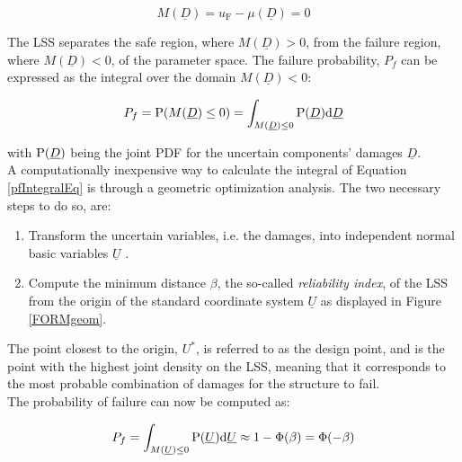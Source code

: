 \begin{equation}
    M(\underline{D}) = u_{\text{F}} - \mu (\underline{D}) = 0
\end{equation}


The \gls{LSS} separates the safe region, where $M(\underline{D}) > 0$, from the failure region, where $M(\underline{D}) < 0$, of the parameter space. The failure probability, $P_f$ can be expressed as the integral over the domain $M(\underline{D}) < 0$:

\begin{equation}
    P_f = \text{P}(M(\underline{D}) \leq 0) = \int _{M(\underline{D})\leq 0} \text{P}(\underline{D}) \mathrm{d}\underline{D} \label{pfIntegralEq}
\end{equation}

with $\text{P}(\underline{D})$ being the joint \gls{PDF} for the uncertain components' damages $\underline{D}$.\\

A computationally inexpensive way to calculate the integral of Equation \ref{pfIntegralEq} is through a geometric optimization analysis. The two necessary steps to do so, are:

\begin{enumerate}
    \item Transform the uncertain variables, i.e. the damages, into independent normal basic variables $\underline{U}$ \footnotemark.
    \item Compute the minimum distance $\beta$, the so-called \textit{reliability index}, of the \gls{LSS} from the origin of the standard coordinate system $\underline{U}$ as displayed in Figure \ref{FORMgeom}.
\end{enumerate}

The point closest to the origin, $U^*$, is referred to as the design point, and is the point with the highest joint density on the \gls{LSS}, meaning that it corresponds to the most probable combination of damages for the structure to fail.\\

The probability of failure can now be computed as:

\begin{equation}
    P_f = \int _{M(\underline{U})\leq 0} \text{P}(\underline{U}) \mathrm{d}\underline{U} \approx 1 - \Phi(\beta) = \Phi (-\beta)
\end{equation}


